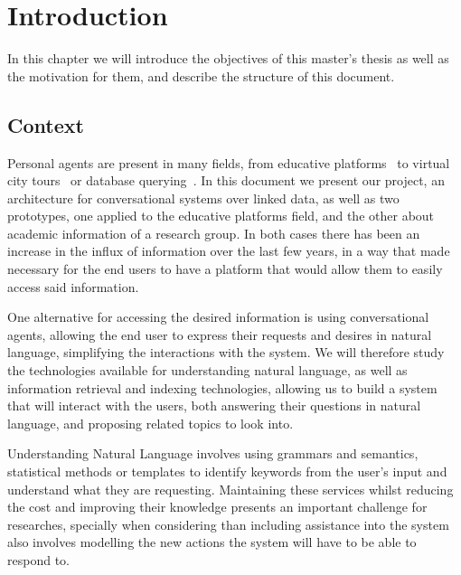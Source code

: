 \chapter{Introduction}
\label{chapter:intro}

\begin{chapterintro}

In this chapter we will introduce the objectives of this master's thesis as well as the motivation for them, and describe the structure of this document.
 
\end{chapterintro}

\cleardoublepage

\section{Context}

Personal agents are present in many fields, from educative platforms~\cite{fonte2012intelligent} to virtual city tours~\cite{bogdanovych2012the} or database querying~\cite{augello2009semantic}. In this document we present our project, an architecture for conversational systems over linked data, as well as two prototypes, one applied to the educative platforms field, and the other about academic information of a research group. In both cases there has been an increase in the influx of information over the last few years, in a way that made necessary for the end users to have a platform that would allow them to easily access said information.

One alternative for accessing the desired information is using conversational agents, allowing the end user to express their requests and desires in natural language, simplifying the interactions with the system. We will therefore study the technologies available for understanding natural language, as well as information retrieval and indexing technologies, allowing us to build a system that will interact with the users, both answering their questions in natural language, and proposing related topics to look into.

Understanding Natural Language involves using grammars and semantics, statistical methods or templates to identify keywords from the user's input and understand what they are requesting. Maintaining these services whilst reducing the cost and improving their knowledge presents an important challenge for researches, specially when considering than including assistance into the system also involves modelling the new actions the system will have to be able to respond to.

